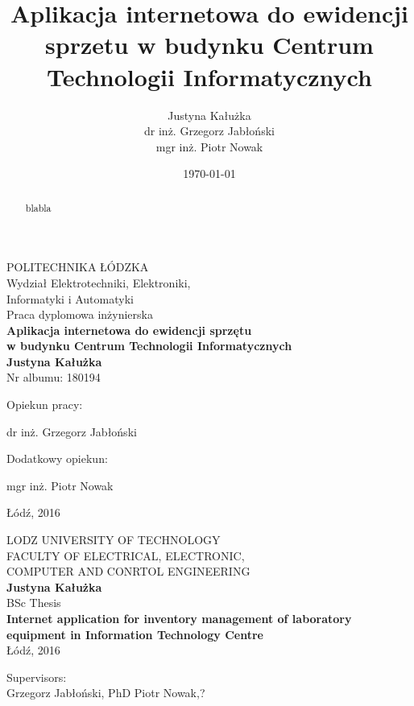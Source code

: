 \documentclass[a4paper,12pt,twoside]{article}
\title{Aplikacja internetowa do ewidencji sprzetu w budynku Centrum Technologii Informatycznych}
\author{Justyna Kałużka\\dr inż. Grzegorz Jabłoński\\mgr inż. Piotr Nowak}
\date{\today}
\begin{document}

\begin{titlepage}

\begin{center}
POLITECHNIKA ŁÓDZKA\\
Wydział Elektrotechniki, Elektroniki, \\
Informatyki i Automatyki\\
\vfill
Praca dyplomowa inżynierska\\
\textbf{Aplikacja internetowa do ewidencji sprzętu\\ w budynku Centrum Technologii Informatycznych\\
Justyna Kałużka}\\
\vfill
Nr albumu:  180194
\end{center}


\vfill
\hfill Opiekun pracy:

\hfill dr inż. Grzegorz Jabłoński

\vfill

\hfill Dodatkowy opiekun:

\hfill mgr inż. Piotr Nowak

\vfill
\begin{center}
Łódź, 2016
\end{center}

\end{titlepage}


\newpage
\begin{center}
LODZ UNIVERSITY OF TECHNOLOGY\\
FACULTY OF ELECTRICAL, ELECTRONIC,\\
COMPUTER AND CONRTOL ENGINEERING\\
\vspace{1.5cm}
\textbf{Justyna Kałużka}\\
BSc Thesis\\
\textbf{Internet application for inventory management of laboratory equipment in Information Technology Centre}\\
\L \'od\'z, 2016
\end{center}
\hspace{1.15cm}Supervisors:\\
\vspace{0.5cm}
\hspace{1cm}Grzegorz Jabłoński, PhD Piotr Nowak,?
\vspace{1.5cm}
\begin{abstract}
blabla
\end{abstract}
\end{document}
